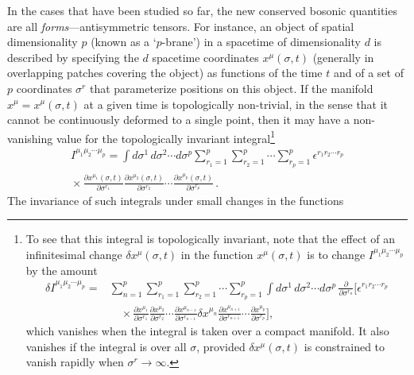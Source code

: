 In the cases that have been studied so far, the new conserved bosonic
quantities are all \emph{forms}---antisymmetric tensors. For instance, an
object of spatial dimensionality \(p\) (known as a `\(p\)-brane') in a
spacetime of dimensionality \(d\) is described by specifying the \(d\)
spacetime coordinates \(x^\mu(\sigma,t)\) (generally in overlapping
patches covering the object) as functions of the time \(t\) and of a set
of \(p\) coordinates \(\sigma^r\) that parameterize positions on this
object. If the manifold \(x^\mu=x^\mu(\sigma,t)\) at a given time is
topologically non-trivial, in the sense that it cannot be continuously
deformed to a single point, then it may have a non-vanishing value for the
topologically invariant integral\footnote{To see that this integral is
topologically invariant, note that the effect of an infinitesimal change
\(\delta x^\mu(\sigma,t)\) in the function \(x^\mu(\sigma,t)\) is to
change \(I^{\mu_1\mu_2\cdots\mu_p}\) by the amount
\[
  \begin{aligned}
  \delta I^{\mu_1\mu_2\cdots\mu_p}
  ={}&\sum_{n=1}^p\sum_{r_1=1}^p\sum_{r_2=1}^p\cdots\sum_{r_p=1}^p
    \int d\sigma^1\,d\sigma^2\cdots d\sigma^p\,
    \frac{\partial}{\partial\sigma^{r_n}}
    \Biggl[
      \epsilon^{r_1r_2\cdots r_p}\\
  &\quad{}\times
      \frac{\partial x^{\mu_1}}{\partial\sigma^{r_1}}
      \frac{\partial x^{\mu_2}}{\partial\sigma^{r_2}}
      \cdots
      \frac{\partial x^{\mu_{n-1}}}{\partial\sigma^{r_{n-1}}}
      \delta x^{\mu_n}
      \frac{\partial x^{\mu_{n+1}}}{\partial\sigma^{r_{n+1}}}
      \cdots
      \frac{\partial x^{\mu_p}}{\partial\sigma^{r_p}}
    \Biggr],
  \end{aligned}
\]
which vanishes when the integral is taken over a compact manifold. It also
vanishes if the integral is over all \(\sigma\), provided
\(\delta x^\mu(\sigma,t)\) is constrained to vanish rapidly when
\(\sigma^r\longrightarrow\infty\).}
\begin{multline}
  I^{\mu_1\mu_2\cdots\mu_p}
  =\int d\sigma^1\,d\sigma^2\cdots d\sigma^p
    \sum_{r_1=1}^p\sum_{r_2=1}^p\cdots\sum_{r_p=1}^p
    \epsilon^{r_1r_2\cdots r_p}\\
  {}\times
    \frac{\partial x^{\mu_1}(\sigma,t)}{\partial\sigma^{r_1}}
    \frac{\partial x^{\mu_2}(\sigma,t)}{\partial\sigma^{r_2}}
    \cdots
    \frac{\partial x^{\mu_p}(\sigma,t)}{\partial\sigma^{r_p}}\,.
  \tag{32.3.1}\label{eq:32.3.1}
\end{multline}
The invariance of such integrals under small changes in the functions
